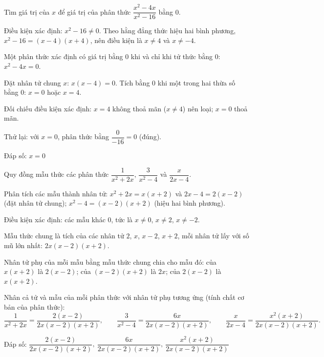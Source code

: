 \begin{problem}[8DS-PS-013]
Tìm giá trị của $x$ để giá trị của phân thức $\dfrac{x^2 - 4x}{x^2 - 16}$ bằng $0$.

\begin{solution}
Điều kiện xác định: $x^2 - 16 \neq 0$. Theo hằng đẳng thức hiệu hai bình phương, $x^2 - 16 = (x - 4)(x + 4)$, nên điều kiện là $x \neq 4$ và $x \neq -4$.

Một phân thức xác định có giá trị bằng $0$ khi và chỉ khi tử thức bằng $0$: $x^2 - 4x = 0$.

Đặt nhân tử chung $x$: $x(x - 4) = 0$. Tích bằng $0$ khi một trong hai thừa số bằng $0$: $x = 0$ hoặc $x = 4$.

Đối chiếu điều kiện xác định: $x = 4$ không thoả mãn ($x \neq 4$) nên loại; $x = 0$ thoả mãn.

Thử lại: với $x = 0$, phân thức bằng $\dfrac{0}{-16} = 0$ (đúng).

Đáp số: $\boxed{x = 0}$
\end{solution}
\end{problem}

\begin{problem}[8DS-PS-014]
Quy đồng mẫu thức các phân thức $\dfrac{1}{x^2 + 2x}$, $\dfrac{3}{x^2 - 4}$ và $\dfrac{x}{2x - 4}$.

\begin{solution}
Phân tích các mẫu thành nhân tử: $x^2 + 2x = x(x + 2)$ và $2x - 4 = 2(x - 2)$ (đặt nhân tử chung); $x^2 - 4 = (x - 2)(x + 2)$ (hiệu hai bình phương).

Điều kiện xác định: các mẫu khác $0$, tức là $x \neq 0$, $x \neq 2$, $x \neq -2$.

Mẫu thức chung là tích của các nhân tử $2$, $x$, $x - 2$, $x + 2$, mỗi nhân tử lấy với số mũ lớn nhất: $2x(x - 2)(x + 2)$.

Nhân tử phụ của mỗi mẫu bằng mẫu thức chung chia cho mẫu đó: của $x(x + 2)$ là $2(x - 2)$; của $(x - 2)(x + 2)$ là $2x$; của $2(x - 2)$ là $x(x + 2)$.

Nhân cả tử và mẫu của mỗi phân thức với nhân tử phụ tương ứng (tính chất cơ bản của phân thức):
\[ \dfrac{1}{x^2 + 2x} = \dfrac{2(x - 2)}{2x(x - 2)(x + 2)}, \qquad \dfrac{3}{x^2 - 4} = \dfrac{6x}{2x(x - 2)(x + 2)}, \qquad \dfrac{x}{2x - 4} = \dfrac{x^2(x + 2)}{2x(x - 2)(x + 2)}. \]

Đáp số: $\boxed{\dfrac{2(x - 2)}{2x(x - 2)(x + 2)},\ \dfrac{6x}{2x(x - 2)(x + 2)},\ \dfrac{x^2(x + 2)}{2x(x - 2)(x + 2)}}$
\end{solution}
\end{problem}

